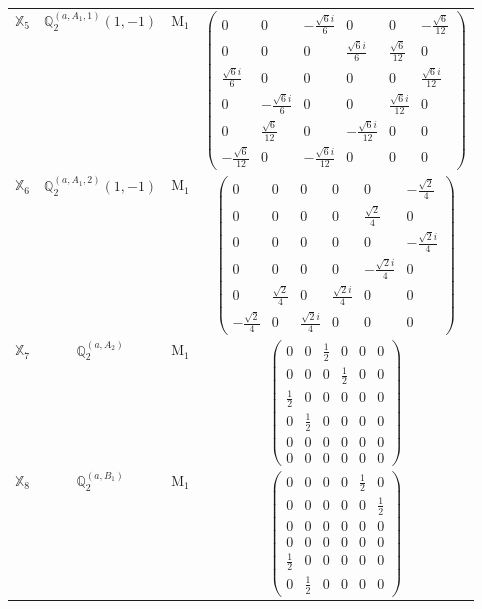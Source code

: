 \documentclass[fleqn,10pt,landscape]{article}
\begin{document}
\begin{itemize}
\begin{center}
\begin{longtable}{c|c|c|c}
$ \mathbb{X}_{5} $ & $\mathbb{Q}_{2}^{(a,A_{1},1)}(1,-1)$ & M$_{1}$ & $\begin{pmatrix} 0 & 0 & - \frac{\sqrt{6} i}{6} & 0 & 0 & - \frac{\sqrt{6}}{12} \\ 0 & 0 & 0 & \frac{\sqrt{6} i}{6} & \frac{\sqrt{6}}{12} & 0 \\ \frac{\sqrt{6} i}{6} & 0 & 0 & 0 & 0 & \frac{\sqrt{6} i}{12} \\ 0 & - \frac{\sqrt{6} i}{6} & 0 & 0 & \frac{\sqrt{6} i}{12} & 0 \\ 0 & \frac{\sqrt{6}}{12} & 0 & - \frac{\sqrt{6} i}{12} & 0 & 0 \\ - \frac{\sqrt{6}}{12} & 0 & - \frac{\sqrt{6} i}{12} & 0 & 0 & 0 \end{pmatrix}$ \\
$ \mathbb{X}_{6} $ & $\mathbb{Q}_{2}^{(a,A_{1},2)}(1,-1)$ & M$_{1}$ & $\begin{pmatrix} 0 & 0 & 0 & 0 & 0 & - \frac{\sqrt{2}}{4} \\ 0 & 0 & 0 & 0 & \frac{\sqrt{2}}{4} & 0 \\ 0 & 0 & 0 & 0 & 0 & - \frac{\sqrt{2} i}{4} \\ 0 & 0 & 0 & 0 & - \frac{\sqrt{2} i}{4} & 0 \\ 0 & \frac{\sqrt{2}}{4} & 0 & \frac{\sqrt{2} i}{4} & 0 & 0 \\ - \frac{\sqrt{2}}{4} & 0 & \frac{\sqrt{2} i}{4} & 0 & 0 & 0 \end{pmatrix}$ \\
$ \mathbb{X}_{7} $ & $\mathbb{Q}_{2}^{(a,A_{2})}$ & M$_{1}$ & $\begin{pmatrix} 0 & 0 & \frac{1}{2} & 0 & 0 & 0 \\ 0 & 0 & 0 & \frac{1}{2} & 0 & 0 \\ \frac{1}{2} & 0 & 0 & 0 & 0 & 0 \\ 0 & \frac{1}{2} & 0 & 0 & 0 & 0 \\ 0 & 0 & 0 & 0 & 0 & 0 \\ 0 & 0 & 0 & 0 & 0 & 0 \end{pmatrix}$ \\
$ \mathbb{X}_{8} $ & $\mathbb{Q}_{2}^{(a,B_{1})}$ & M$_{1}$ & $\begin{pmatrix} 0 & 0 & 0 & 0 & \frac{1}{2} & 0 \\ 0 & 0 & 0 & 0 & 0 & \frac{1}{2} \\ 0 & 0 & 0 & 0 & 0 & 0 \\ 0 & 0 & 0 & 0 & 0 & 0 \\ \frac{1}{2} & 0 & 0 & 0 & 0 & 0 \\ 0 & \frac{1}{2} & 0 & 0 & 0 & 0 \end{pmatrix}$ \\

\end{longtable}
\end{center}
\end{itemize}
\end{document}
